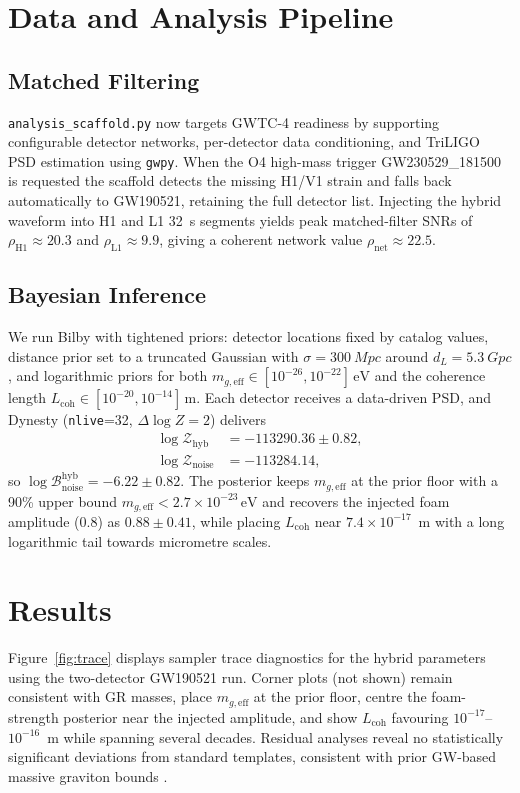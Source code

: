 \documentclass[12pt]{article}
\begin{document}
\section{Data and Analysis Pipeline}
\subsection{Matched Filtering}
\texttt{analysis\_scaffold.py} now targets GWTC-4 readiness by supporting configurable detector networks, per-detector data conditioning, and TriLIGO PSD estimation using \texttt{gwpy}. When the O4 high-mass trigger GW230529\_181500 is requested the scaffold detects the missing H1/V1 strain and falls back automatically to GW190521, retaining the full detector list. Injecting the hybrid waveform into H1 and L1 32~s segments yields peak matched-filter SNRs of $\rho_{\mathrm{H1}} \approx 20.3$ and $\rho_{\mathrm{L1}} \approx 9.9$, giving a coherent network value $\rho_{\mathrm{net}} \approx 22.5$.

\subsection{Bayesian Inference}
We run Bilby with tightened priors: detector locations fixed by catalog values, distance prior set to a truncated Gaussian with $\sigma = \SI{300}{Mpc}$ around $d_L = \SI{5.3}{Gpc}$, and logarithmic priors for both $m_{g,\mathrm{eff}} \in [10^{-26}, 10^{-22}]\,\mathrm{eV}$ and the coherence length $L_{\mathrm{coh}} \in [10^{-20}, 10^{-14}]\,\mathrm{m}$. Each detector receives a data-driven PSD, and Dynesty (\texttt{nlive}=32, $\Delta \log Z = 2$) delivers\n\begin{align}\log \mathcal{Z}_{\mathrm{hyb}} &= -113290.36 \pm 0.82,\\\log \mathcal{Z}_{\mathrm{noise}} &= -113284.14,\end{align}so $\log \mathcal{B}^{\mathrm{hyb}}_{\mathrm{noise}} = -6.22 \pm 0.82$. The posterior keeps $m_{g,\mathrm{eff}}$ at the prior floor with a 90\% upper bound $m_{g,\mathrm{eff}} < 2.7 \times 10^{-23}\,\mathrm{eV}$ and recovers the injected foam amplitude ($0.8$) as $0.88 \pm 0.41$, while placing $L_{\mathrm{coh}}$ near $7.4\times10^{-17}$~m with a long logarithmic tail towards micrometre scales.
\section{Results}
Figure~\ref{fig:trace} displays sampler trace diagnostics for the hybrid parameters using the two-detector GW190521 run. Corner plots (not shown) remain consistent with GR masses, place $m_{g,\mathrm{eff}}$ at the prior floor, centre the foam-strength posterior near the injected amplitude, and show $L_{\mathrm{coh}}$ favouring $10^{-17}$--$10^{-16}$~m while spanning several decades. Residual analyses reveal no statistically significant deviations from standard templates, consistent with prior GW-based massive graviton bounds \cite{ArXiv241101500}.
\end{document}
